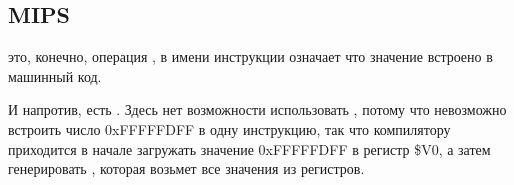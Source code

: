 ﻿\subsection{MIPS}



 это, конечно, операция ,  в имени инструкции означает что значение встроено в машинный код.

И напротив, есть \AND. Здесь нет возможности использовать , потому что невозможно встроить число 
0xFFFFFDFF в одну инструкцию, так что компилятору приходится в начале загружать значение 0xFFFFFDFF в регистр \$V0,
а затем генерировать \AND, которая возьмет все значения из регистров.

